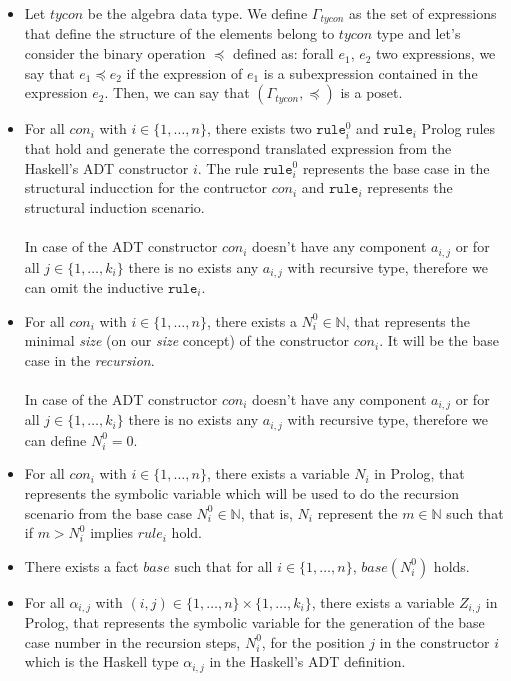 \documentclass{report}
\theoremstyle{definition}
\theoremstyle{definition}
\newcommand{\ttt}[1]{\texttt{#1}}
\begin{document}
\begin{itemize}
	\item Let $tycon$ be the algebra data type. We define $\Gamma_{tycon}$ as the set of expressions that define the structure of the elements belong to $tycon$ type and let's consider the binary operation $\preceq$ defined as: forall $e_1$, $e_2$ two expressions, we say that $e_1 \preceq e_2$ if the expression of $e_1$ is a subexpression contained in the expression $e_2$. Then, we can say that $(\Gamma_{tycon}, \preceq)$ is a poset.
	\item For all $con_i$ with $i \in \{1, \ldots, n \}$, there exists two $\ttt{rule}_{i}^{0}$ and $\ttt{rule}_i$ Prolog rules that hold and generate the correspond translated expression from the Haskell's ADT constructor $i$. The rule $\ttt{rule}_{i}^{0}$ represents the base case in the structural inducction for the contructor $con_i$ and $\ttt{rule}_i$ represents the structural induction scenario.\\\\
	In case of the ADT constructor $con_i$ doesn't have any component $a_{i,j}$ or for all $j \in \{1, \ldots, k_i \}$ there is no exists any $a_{i,j}$ with recursive type, therefore we can omit the inductive $\ttt{rule}_i$.
	\item For all $con_i$ with $i \in \{1, \ldots, n \}$, there exists a $N_{i}^{0} \in \mathbb{N}$, that represents the minimal \textit{size} (on our \textit{size} concept) of the constructor $con_i$. It will be the base case in the \textit{recursion}.\\\\
	In case of the ADT constructor $con_i$ doesn't have any component $a_{i,j}$ or for all $j \in \{1, \ldots, k_i \}$ there is no exists any $a_{i,j}$ with recursive type, therefore we can define $N_{i}^{0} = 0$.
	\item For all $con_i$ with $i \in \{1, \ldots, n \}$, there exists a variable $N_i$ in Prolog, that represents the symbolic variable which will be used to do the recursion scenario from the base case $N_{i}^{0} \in \mathbb{N}$, that is, $N_i$ represent the $m \in \mathbb{N}$ such that if $m > N_{i}^{0}$ implies $rule_i$ hold.
	\item There exists a fact $base$ such that for all $i \in \{1, \ldots, n \}$, $base(N_{i}^{0})$ holds.
	\item For all $\alpha_{i,j}$ with $(i,j) \in \{1, \ldots, n \} \times \{1, \ldots, k_i \}$, there exists a variable $Z_{i,j}$ in Prolog, that represents the symbolic variable for the generation of the base case number in the recursion steps, $N_{i}^{0}$, for the position $j$ in the constructor $i$ which is the Haskell type $\alpha_{i,j}$ in the Haskell's ADT definition.\\\\

\end{itemize}
\end{document}
